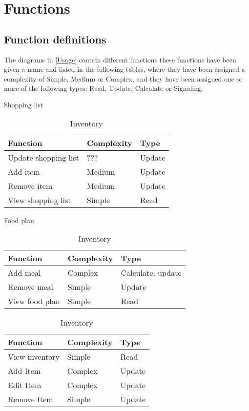 	
	\chapter{Functions}
	\section{Function definitions}
	The diagrams in \ref{Usage} contain different functions these functions have been given a name and listed in the following tables, where they have been assigned a complexity of Simple, Medium or Complex, and they have been assigned one or more of the following types; Read, Update, Calculate or Signaling.
	\begin{table}[H]
	\centering
	\caption{Shopping list}
		\begin{tabular}{|l|l|l|}\hline
		\textbf{Function}&\textbf{Complexity}&\textbf{Type}\\\hline
	  Update shopping list  &  ???     & Update \\\hline
	  Add item              &  Medium  & Update \\\hline
	  Remove item           &  Medium  & Update \\\hline
	  View shopping list    &  Simple  & Read   \\\hline
	  \end{tabular}
	\linebreak
	\caption{Food plan}
	  \begin{tabular}{|l|l|l|}\hline
		\textbf{Function}&\textbf{Complexity}&\textbf{Type}\\\hline
	  Add meal              &  Complex & Calculate, update \\\hline
	  Remove meal           &  Simple  & Update            \\\hline
	  View food plan        &  Simple  & Read              \\\hline
	  \end{tabular}
	\linebreak
	\caption{Inventory}
	  \begin{tabular}{|l|l|l|}\hline
		\textbf{Function}&\textbf{Complexity}&\textbf{Type}\\\hline
	  View inventory        &  Simple  & Read   \\\hline
	  Add Item              &  Complex & Update \\\hline
	  Edit Item             &  Complex & Update \\\hline
	  Remove Item           &  Simple  & Update \\\hline
\end{tabular}	  	  
	\end{table}
